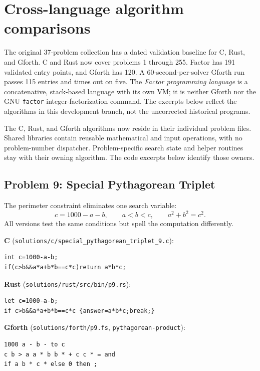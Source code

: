 \section{Cross-language algorithm comparisons}
\label{sec:crosslanguage}

The original 37-problem collection has a dated validation baseline for C, Rust,
and Gforth. C and Rust now cover problems 1 through 255. Factor has 191 validated
entry points, and Gforth has 120. A
60-second-per-solver Gforth run passes 115 entries and times out on five. The
\emph{Factor programming language} is a concatenative,
stack-based language with its own VM; it is neither Gforth nor the GNU
\texttt{factor} integer-factorization command. The excerpts below reflect
the algorithms in this development branch, not the uncorrected historical
programs.

The C, Rust, and Gforth algorithms now reside in their individual problem files.
Shared libraries contain reusable mathematical and input operations, with no
problem-number dispatcher. Problem-specific search state and helper routines
stay with their owning algorithm. The code excerpts below identify those owners.

\lstset{
 basicstyle=\ttfamily\footnotesize,
 columns=fullflexible,
 keepspaces=true,
 breaklines=true,
 showstringspaces=false,
 frame=single,
 framesep=3pt,
 aboveskip=5pt,
 belowskip=5pt,
 xleftmargin=0.02\linewidth,
 xrightmargin=0.02\linewidth
}

\subsection{Problem 9: Special Pythagorean Triplet}
The perimeter constraint eliminates one search variable:
\[
  c=1000-a-b,\qquad a<b<c,\qquad a^2+b^2=c^2.
\]
All versions test the same conditions but spell the computation differently.

\textbf{C} (\texttt{solutions/c/special\_pythagorean\_triplet\_9.c}):
\begin{lstlisting}
int c=1000-a-b;
if(c>b&&a*a+b*b==c*c)return a*b*c;
\end{lstlisting}

\textbf{Rust} (\texttt{solutions/rust/src/bin/p9.rs}):
\begin{lstlisting}
let c=1000-a-b;
if c>b&&a*a+b*b==c*c {answer=a*b*c;break;}
\end{lstlisting}

\textbf{Gforth} (\texttt{solutions/forth/p9.fs}, \texttt{pythagorean-product}):
\begin{lstlisting}
1000 a - b - to c
c b > a a * b b * + c c * = and
if a b * c * else 0 then ;
\end{lstlisting}

